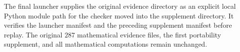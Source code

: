 The final launcher supplies the original evidence directory as an explicit local Python module path for the checker moved into the supplement directory. It verifies the launcher manifest and the preceding supplement manifest before replay. The original $287$ mathematical evidence files, the first portability supplement, and all mathematical computations remain unchanged.
